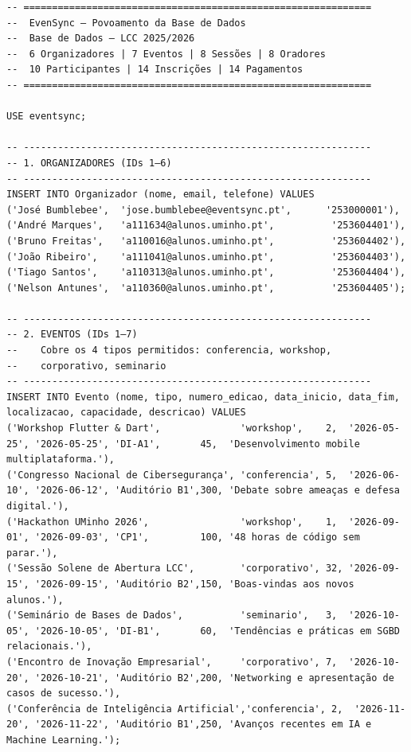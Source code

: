 \documentclass[runningheads]{llncs}
\begin{document}
\begin{small}
\begin{verbatim}
-- =============================================================
--  EvenSync — Povoamento da Base de Dados
--  Base de Dados — LCC 2025/2026
--  6 Organizadores | 7 Eventos | 8 Sessões | 8 Oradores
--  10 Participantes | 14 Inscrições | 14 Pagamentos
-- =============================================================

USE eventsync;

-- -------------------------------------------------------------
-- 1. ORGANIZADORES (IDs 1–6)
-- -------------------------------------------------------------
INSERT INTO Organizador (nome, email, telefone) VALUES
('José Bumblebee',  'jose.bumblebee@eventsync.pt',      '253000001'),
('André Marques',   'a111634@alunos.uminho.pt',          '253604401'),
('Bruno Freitas',   'a110016@alunos.uminho.pt',          '253604402'),
('João Ribeiro',    'a111041@alunos.uminho.pt',          '253604403'),
('Tiago Santos',    'a110313@alunos.uminho.pt',          '253604404'),
('Nelson Antunes',  'a110360@alunos.uminho.pt',          '253604405');

-- -------------------------------------------------------------
-- 2. EVENTOS (IDs 1–7)
--    Cobre os 4 tipos permitidos: conferencia, workshop,
--    corporativo, seminario
-- -------------------------------------------------------------
INSERT INTO Evento (nome, tipo, numero_edicao, data_inicio, data_fim, localizacao, capacidade, descricao) VALUES
('Workshop Flutter & Dart',              'workshop',    2,  '2026-05-25', '2026-05-25', 'DI-A1',       45,  'Desenvolvimento mobile multiplataforma.'),
('Congresso Nacional de Cibersegurança', 'conferencia', 5,  '2026-06-10', '2026-06-12', 'Auditório B1',300, 'Debate sobre ameaças e defesa digital.'),
('Hackathon UMinho 2026',                'workshop',    1,  '2026-09-01', '2026-09-03', 'CP1',         100, '48 horas de código sem parar.'),
('Sessão Solene de Abertura LCC',        'corporativo', 32, '2026-09-15', '2026-09-15', 'Auditório B2',150, 'Boas-vindas aos novos alunos.'),
('Seminário de Bases de Dados',          'seminario',   3,  '2026-10-05', '2026-10-05', 'DI-B1',       60,  'Tendências e práticas em SGBD relacionais.'),
('Encontro de Inovação Empresarial',     'corporativo', 7,  '2026-10-20', '2026-10-21', 'Auditório B2',200, 'Networking e apresentação de casos de sucesso.'),
('Conferência de Inteligência Artificial','conferencia', 2,  '2026-11-20', '2026-11-22', 'Auditório B1',250, 'Avanços recentes em IA e Machine Learning.');


\end{verbatim}
\end{small}
\end{document}
